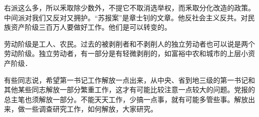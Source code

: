 右派这么多，所以釆取除少数外，不提它不取消选举权，而釆取分化改造的政策。中间派对我们又反对又拥护。“苏报案”是章士钊的文章。他反社会主义反共。对民族资产阶级三百万人要做好工作。他们是可以转变的。

劳动阶级是工人、农民。过去的被剥削者和不剥削人的独立劳动者也可以说是两个劳动阶级。独立劳动者，有一部分是有轻微剥削的，如富裕中农和城市的上层小资产阶级．

有些同志说，希望第一书记工作解放一点出来，从中央、省到地三级的第一书记和其他某些同志解放一部分繁重工作，这才有可能比较注意一点较大的问题。党报的总主笔也须解放一部分。不能天天工作，少搞一点事，就有可能多管些事。解放出来，做一些调查研究工作，如何解放，大家研究。



